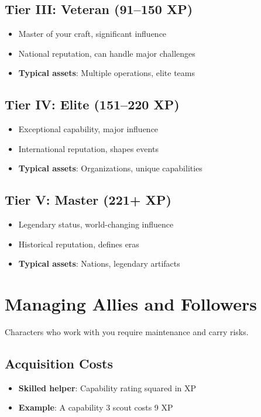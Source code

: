 \subsection*{Tier III: Veteran (91–150 XP)}
\begin{itemize}
\item Master of your craft, significant influence
\item National reputation, can handle major challenges
\item \textbf{Typical assets}: Multiple operations, elite teams
\end{itemize}

\subsection*{Tier IV: Elite (151–220 XP)}
\begin{itemize}
\item Exceptional capability, major influence
\item International reputation, shapes events
\item \textbf{Typical assets}: Organizations, unique capabilities
\end{itemize}

\subsection*{Tier V: Master (221+ XP)}
\begin{itemize}
\item Legendary status, world-changing influence
\item Historical reputation, defines eras
\item \textbf{Typical assets}: Nations, legendary artifacts
\end{itemize}

\section{Managing Allies and Followers}

Characters who work with you require maintenance and carry risks.

\subsection*{Acquisition Costs}
\begin{itemize}
\item \textbf{Skilled helper}: Capability rating squared in XP
\item \textbf{Example}: A capability 3 scout costs 9 XP
\end{itemize}

